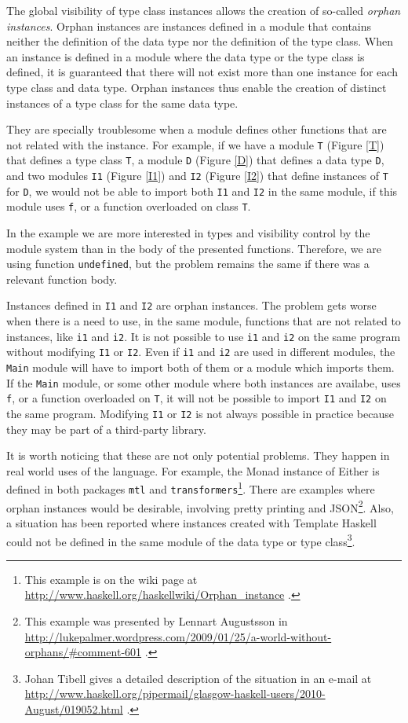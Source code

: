 \documentclass[msc]{ppgccufmg}
\begin{document}
The global visibility of type class instances allows the creation of so-called {\em
  orphan instances\/}.  Orphan instances are instances defined in a
module that contains neither the definition of the data type nor the
definition of the type class.  When an instance is defined in a module
where the data type or the type class is defined, it is guaranteed
that there will not exist more than one instance for each type class
and data type.  Orphan instances thus enable the
creation of distinct instances of a type class for the same data type.

They are specially troublesome when a module defines other functions that are
not related with the instance.  For example, if we have a module \texttt{T}
(Figure \ref{T}) that defines a type class \texttt{T}, a module \texttt{D} (Figure \ref{D}) that defines a data
type \texttt{D}, and two modules \texttt{I1} (Figure \ref{I1}) and
\texttt{I2} (Figure \ref{I2}) that define
instances of \texttt{T} for \texttt{D}, we would not be able to import both
\texttt{I1} and \texttt{I2} in the same
module, if this module uses \texttt{f}, or a function overloaded on
  class \texttt{T}.

In the example we are more interested in types and visibility control
by the module system than in the body of the presented functions.
Therefore, we are using function \texttt{undefined}, but the problem
remains the same if there was a relevant function body.

Instances defined in \texttt{I1} and \texttt{I2} are orphan instances.
The problem gets worse when there is a need to use, in the same
module, functions that are not related to instances, like \texttt{i1}
and \texttt{i2}.  It is not possible to use \texttt{i1} and \texttt{i2} on
the same program without modifying \texttt{I1} or \texttt{I2}. Even if \texttt{i1}
and \texttt{i2} are used in different modules, the \texttt{Main} module will
have to import both of them or a module which imports them.  If the
\texttt{Main} module, or some other module where both instances are availabe,
uses \texttt{f}, or a function overloaded on \texttt{T}, it will not be possible
to import \texttt{I1} and \texttt{I2} on the same program.  Modifying
\texttt{I1} or \texttt{I2} is not always possible in practice because they
may be part of a third-party library.

It is worth noticing that these are not only potential problems. They
happen in real world uses of the language.  For example, the Monad
instance of Either is defined in both packages \texttt{mtl} and
\texttt{transformers}\footnote{This example is on the wiki page at
  \url{http://www.haskell.org/haskellwiki/Orphan_instance} .}.  There
are examples where orphan instances would be desirable, involving
pretty printing and JSON\footnote{This example was presented by
  Lennart Augustsson in
  \url{http://lukepalmer.wordpress.com/2009/01/25/a-world-without-orphans/\#comment-601}
  .}.  Also, a situation has been reported where instances created
with Template Haskell could not be defined in the same module of the
data type or type class\footnote{Johan Tibell gives a detailed
  description of the situation in an e-mail at
  \url{http://www.haskell.org/pipermail/glasgow-haskell-users/2010-August/019052.html}
  .}.
\end{document}
